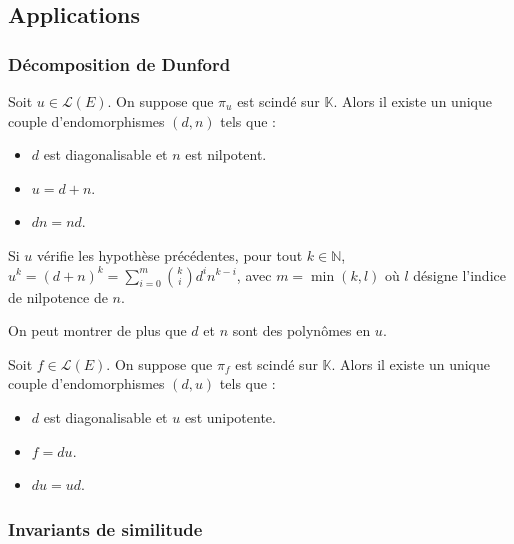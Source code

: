 	\subsection{Applications}

	\subsubsection{Décomposition de Dunford}


	\begin{theorem}
		Soit $u \in \mathcal{L}(E)$. On suppose que $\pi_u$ est scindé sur $\mathbb{K}$. Alors il existe un unique couple d'endomorphismes $(d, n)$ tels que :
		\begin{itemize}
			\item $d$ est diagonalisable et $n$ est nilpotent.
			\item $u = d + n$.
			\item $d n = n d$.
		\end{itemize}
	\end{theorem}

	\begin{corollary}
		Si $u$ vérifie les hypothèse précédentes, pour tout $k \in \mathbb{N}$, $u^k = (d + n)^k = \sum_{i=0}^m \binom{k}{i} d^i n^{k-i}$, avec $m = \min(k, l)$ où $l$ désigne l'indice de nilpotence de $n$.
	\end{corollary}

	\begin{remark}
		On peut montrer de plus que $d$ et $n$ sont des polynômes en $u$.
	\end{remark}


	\begin{theorem}
		Soit $f \in \mathcal{L}(E)$. On suppose que $\pi_f$ est scindé sur $\mathbb{K}$. Alors il existe un unique couple d'endomorphismes $(d, u)$ tels que :
		\begin{itemize}
			\item $d$ est diagonalisable et $u$ est unipotente.
			\item $f = du$.
			\item $du = ud$.
		\end{itemize}
	\end{theorem}

	\subsubsection{Invariants de similitude}

